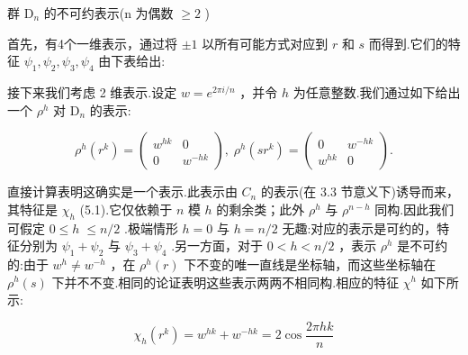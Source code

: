 \documentclass[10pt]{article}
\begin{document}
群 \({\mathrm{D}}_{n}\) 的不可约表示(n 为偶数 \(\geq  2\) )

首先，有4个一维表示，通过将 \(\pm  1\) 以所有可能方式对应到 \(r\) 和 \(s\) 而得到.它们的特征 \({\psi }_{1},{\psi }_{2},{\psi }_{3},{\psi }_{4}\) 由下表给出:

\begin{center}
\end{center}

接下来我们考虑 2 维表示.设定 \(w = {e}^{{2\pi i}/n}\) ，并令 \(h\) 为任意整数.我们通过如下给出一个 \({\rho }^{h}\) 对 \({\mathrm{D}}_{n}\) 的表示:

\[
{\rho }^{h}\left( {r}^{k}\right)  = \left( \begin{matrix} {w}^{hk} & 0 \\  0 & {w}^{-{hk}} \end{matrix}\right) ,\;{\rho }^{h}\left( {s{r}^{k}}\right)  = \left( \begin{matrix} 0 & {w}^{-{hk}} \\  {w}^{hk} & 0 \end{matrix}\right) .
\]

直接计算表明这确实是一个表示.此表示由 \({C}_{n}\) 的表示(在 3.3 节意义下)诱导而来，其特征是 \({\chi }_{h}\) (5.1).它仅依赖于 \(n\) 模 \(h\) 的剩余类；此外 \({\rho }^{h}\) 与 \({\rho }^{n - h}\) 同构.因此我们可假定 \(0 \leq  h \; \leq  n/2\) .极端情形 \(h = 0\) 与 \(h = n/2\) 无趣:对应的表示是可约的，特征分别为 \({\psi }_{1} + {\psi }_{2}\) 与 \({\psi }_{3} + {\psi }_{4}\) .另一方面，对于 \(0 < h < n/2\) ，表示 \({\rho }^{h}\) 是不可约的:由于 \({w}^{h} \neq  {w}^{-h}\) ，在 \({\rho }^{h}\left( r\right)\) 下不变的唯一直线是坐标轴，而这些坐标轴在 \({\rho }^{h}\left( s\right)\) 下并不不变.相同的论证表明这些表示两两不相同构.相应的特征 \({\chi }^{h}\) 如下所示:

\[
{\chi }_{h}\left( {r}^{k}\right)  = {w}^{hk} + {w}^{-{hk}} = 2\cos \frac{2\pi hk}{n}
\]
\end{document}
